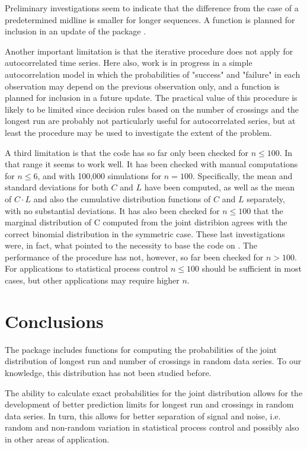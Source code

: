 Preliminary investigations seem to indicate that the difference from the case of a predetermined midline is smaller for longer sequences. A function  is planned for inclusion in an update of the package . 

Another important limitation is that the iterative procedure does not apply for autocorrelated time series. Here also, work is in progress in a simple autocorrelation model in which the probabilities of "success" and "failure" in each observation may depend on the previous observation only, and a function  is planned for inclusion in a future update. The practical value of this procedure is likely to be limited  since decision rules based on the number of crossings and the longest run are probably not particularly useful for autocorrelated series, but at least the procedure may be used to investigate the extent of the problem.

A third limitation is that the code has so far only been checked for $n \leq 100$. In that range it seems to work well. It has been checked with manual computations for $n \leq 6$, and with 100,000 simulations for $n=100$. Specifically, the mean and standard deviations for both $C$ and $L$ have been computed, as well as the mean of $C \cdot L$ and also the cumulative distribution functions of $C$ and $L$ separately, with no substantial deviations. It has also been checked for $n \leq 100$ that the marginal distribution of C computed from the joint distribion agrees with the correct binomial distribution in the symmetric case. These last investigations were, in fact, what pointed to the necessity to base the code on . The performance of the procedure has not, however, so far been checked for $n>100$. For applications to statistical process control $n \leq 100$ should be sufficient in most cases, but other applications may require higher $n$.

\section{Conclusions}
 
The  package includes functions for computing the probabilities of the joint distribution of longest run and number of crossings in random data series. To our knowledge, this distribution has not been studied before.
 
The ability to calculate exact probabilities for the joint distribution allows for the development of better prediction limits for longest run and crossings in random data series. In turn, this allows for better separation of signal and noise, i.e. random and non-random variation in statistical process control and possibly also in other areas of application.

